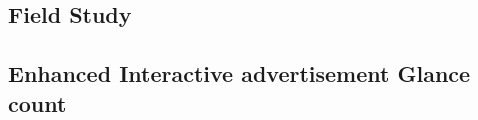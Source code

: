 \begin{appendices}












\chapter{Field Study}

\setcounter{figure}{0}
\setcounter{table}{0}
    
\section{Enhanced Interactive advertisement Glance count}


\end{appendices}
